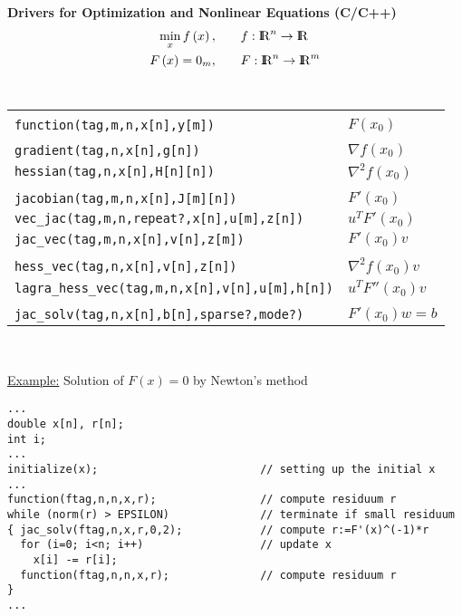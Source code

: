 \documentclass[12pt,oneside,a4paper]{article}
\newcommand{\R}{{ {\rm I} \kern -.225em {\rm R} }}
\begin{document}
\newpage
\begin{center}\Large
{\Huge \bf Drivers for Optimization and Nonlinear Equations (C/C++)}\\[-0.5ex]
\begin{align*}
     \min_{x}f\left(x\right),\qquad & f:\R^n\rightarrow\R\\
     F\left(x\right)=0_m, \qquad  & F:\R^n\rightarrow\R^m
\end{align*}\\[0.5ex]

\begin{tabular}{|p{13.3cm}|p{3.3cm}|}
\hline & \\[-2.0ex]
{\tt function(tag,m,n,x[n],y[m])} & $F\left(x_0\right)$ \\[1.0ex]
\hline& \\[-2.0ex] 
{\tt gradient(tag,n,x[n],g[n])} & $\nabla f\left(x_0\right)$ \\[0.5ex]
{\tt hessian(tag,n,x[n],H[n][n])} & $\nabla^2 f\left(x_0\right)$ \\[1.0ex]
\hline & \\[-2.0ex] 
{\tt jacobian(tag,m,n,x[n],J[m][n])} & $F'\left(x_0\right)$ \\[0.5ex]
{\tt vec\_jac(tag,m,n,repeat?,x[n],u[m],z[n])} & $u^TF'\left(x_0\right)$ \\[0.5ex]
{\tt jac\_vec(tag,m,n,x[n],v[n],z[m])} & $F'\left(x_0\right)v$ \\[1.0ex]
\hline & \\[-2.0ex] 
{\tt hess\_vec(tag,n,x[n],v[n],z[n])} & $\nabla^2f\left(x_0\right)v$ \\[0.5ex]
{\tt lagra\_hess\_vec(tag,m,n,x[n],v[n],u[m],h[n])} & $u^TF''\left(x_0\right)v$ \\[1.0ex]
\hline & \\[-2.0ex] 
{\tt jac\_solv(tag,n,x[n],b[n],sparse?,mode?)} & $F'\left(x_0\right)w=b$ \\[1.0ex]
\hline
\end{tabular}\\[5ex]
%
\begin{minipage}[h]{160mm}
\small
\underline{Example:}  \hspace{0.5cm} Solution of $F(x)=0$ by Newton's method
\begin{verbatim}
...
double x[n], r[n];
int i;
...
initialize(x);                         // setting up the initial x
...
function(ftag,n,n,x,r);                // compute residuum r
while (norm(r) > EPSILON)              // terminate if small residuum
{ jac_solv(ftag,n,x,r,0,2);            // compute r:=F'(x)^(-1)*r
  for (i=0; i<n; i++)                  // update x
    x[i] -= r[i]; 
  function(ftag,n,n,x,r);              // compute residuum r
}
...
\end{verbatim}
\end{minipage}
\end{center}
\end{document}
